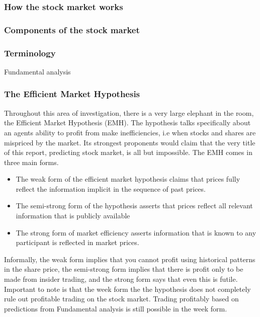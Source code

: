 \documentclass{report}
\begin{document}
\subsubsection{How the stock market works}
\subsubsection{Components of the stock market}
\subsubsection{Terminology}

Fundamental analysis

\subsubsection{The Efficient Market Hypothesis}

Throughout this area of investigation, there is a very large elephant in the room, the Efficient Market Hypothesis (EMH). The hypothesis talks specifically about an agents ability to profit from make inefficiencies, i.e when stocks and shares are mispriced by the market. Its strongest proponents would claim that the very title of this report, predicting stock market, is all but impossible. The EMH comes in three main forms. \cite{dimson1998brief}
\begin{itemize} 
  \item The weak form of the efficient market hypothesis claims that prices fully
reflect the information implicit in the sequence of past prices. 

  \item The semi-strong form of the hypothesis asserts that prices reflect all relevant information that is publicly available
  
  \item The strong form of market efficiency asserts information that is known to any participant is reflected in market prices.
\end{itemize}

Informally, the weak form implies that you cannot profit using historical patterns in the share price, the semi-strong form implies that there is profit only to be made from insider trading, and the strong form says that even this is futile. Important to note is that the week form the the hypothesis does not completely rule out profitable trading on the stock market. Trading profitably based on predictions from Fundamental analysis is still possible in the week form. 
\end{document}
